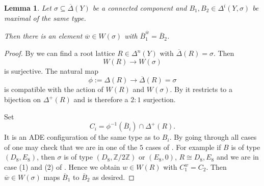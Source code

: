 \documentclass[a4paper]{amsart}
\theoremstyle{definition}
\theoremstyle{plain}
\newtheorem{lemma}[definition]{Lemma}
\newcommand{\ZZ}{\mathbb{Z}}
\newcommand{\DeltabarY}{\overline{\Delta}(Y)}
\begin{document}
\begin{lemma}\label{lem:max_helper}
    Let $\sigma \subseteq \DeltabarY$ be a connected component and $B_1,B_2 \in \Delta^i(Y,\sigma)$ be maximal of the same type.
 
    Then there is an element $\overline{w} \in W(\sigma)$ with $\overline{B}_1^{\overline{w}}=\overline{B}_2$. 
\end{lemma}
\begin{proof}
By  we can find a root lattice $R \in \Delta^n(Y)$ with $\overline{\Delta}(R)=\sigma$.
Then 
\[W(R) \to W(\sigma)\]
is surjective. The natural map 
\[\phi:=\Delta(R)\to \overline{\Delta}(R)=\sigma\] 
is compatible with the action of $W(R)$ and $W(\sigma)$.
By  it restricts to a bijection on $\Delta^+(R)$ and is therefore a $2:1$ surjection.

Set 
\[C_i = \phi^{-1}(\overline{B}_i)\cap \Delta^+(R).\] 
It is an ADE configuration of the same type as to $B_i$.
By going through all cases of  one may check that we are in one of the $5$ cases of . For example if $B$ is of type $(D_8,E_8)$, then $\sigma$ is of type $(D_8, \ZZ/2\ZZ)$ or $(E_8, 0)$, $R\cong D_8,E_8$ and we are in case (1) and (2) of .
Hence we obtain $w \in W(R)$ with $C_1^w=C_2$. Then $\overline{w}\in W(\sigma)$ maps $\overline{B}_1$ to $\overline{B}_2$ as desired. 
\end{proof}
\end{document}
